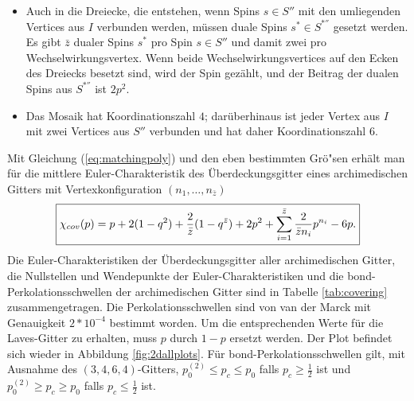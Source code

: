 \begin{itemize}
\item Auch in die Dreiecke, die entstehen, wenn Spins $s\in S''$ mit den umliegenden Vertices aus $I$ verbunden werden, m\"ussen duale Spins $s^*\in S^{*''}$ gesetzt werden. Es gibt $\bar{z}$ dualer Spins $s^*$ pro Spin $s\in S''$ und damit zwei pro Wechselwirkungsvertex. Wenn beide Wechselwirkungsvertices auf den Ecken des Dreiecks besetzt sind, wird der Spin gez\"ahlt, und der Beitrag der dualen Spins aus $S^{*''}$ ist  $2p^2$.
\item Das Mosaik hat Koordinationszahl $4$; dar\"uberhinaus ist jeder Vertex aus $I$ mit zwei Vertices aus $S''$ verbunden und hat daher Koordinationszahl $6$.
\end{itemize}
Mit Gleichung (\ref{eq:matchingpoly}) und den eben bestimmten Gr\"o"sen erh\"alt man f\"ur die mittlere Euler-Charakteristik des \"Uberdeckungsgitter eines archimedischen Gitters mit Vertexkonfiguration $(n_1,\ldots,n_{\bar{z}})$
\begin{equation}
\label{eq:cov}
  \fbox{$\displaystyle \chi_{cov}(p)=p+2(1-q^2)+\frac{2}{\bar{z}}(1-q^{\bar{z}})+2p^2+\sum_{i=1}^{\bar{z}}\frac{2}{\bar{z}n_i}p^{n_i}-6p.$}
\end{equation}
Die Euler-Charakteristiken der \"Uberdeckungsgitter aller archimedischen Gitter, die Nullstellen und Wendepunkte der Euler-Charakteristiken und die bond-Perkolationsschwellen der archimedischen Gitter sind in Tabelle \ref{tab:covering} zusammengetragen. Die Perkolationsschwellen sind von van der Marck \cite{Marck:03} mit Genauigkeit $2*10^{-4}$ bestimmt worden. Um die entsprechenden Werte f\"ur die Laves-Gitter zu erhalten, muss $p$ durch $1-p$ ersetzt werden. Der Plot befindet sich wieder in Abbildung \ref{fig:2dallplots}. F\"ur bond-Perkolationsschwellen gilt, mit Ausnahme des $(3,4,6,4)$-Gitters, $p_0^{(2)}\leq p_c \leq p_0$ falls $p_c \geq \frac{1}{2}$ ist und $p_0^{(2)}\geq p_c \geq p_0$ falls $p_c \leq \frac{1}{2}$ ist.

